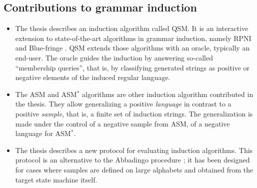 
\subsection{Contributions to grammar induction\label{subsection:intro-contrib-grammar-induction}}

\begin{itemize}
\item The thesis describes an induction algorithm called QSM. It is an interactive extension to state-of-the-art algorithms in grammar induction, namely RPNI and Blue-fringe \cite{Oncina:1992, Lang:1998}. QSM extends those algorithms with an oracle, typically an end-user. The oracle guides the induction by answering so-called ``membership queries'', that is, by classifying generated strings as positive or negative elements of the induced regular language.
\item The ASM and ASM$^*$ algorithms are other induction algorithm contributed in the thesis. They allow generalizing a positive \emph{language} in contrast to a positive \emph{sample}, that is, a finite set of induction strings. The generalization is made under the control of a negative sample from ASM, of a negative language for ASM$^*$.
\item The thesis describes a new protocol for evaluating induction algorithms. This protocol is an alternative to the Abbadingo procedure \cite{Lang:1998}; it has been designed for cases where samples are defined on large alphabets and obtained from the target state machine itself. 
\end{itemize}
